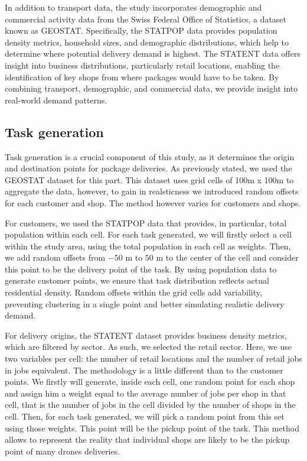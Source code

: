In addition to transport data, the study incorporates demographic and commercial activity data from the Swiss Federal Office of Statistics, a dataset known as GEOSTAT. Specifically, the STATPOP data provides population density metrics, household sizes, and demographic distributions, which help to determine where potential delivery demand is highest. The STATENT data offers insight into business distributions, particularly retail locations, enabling the identification of key shops from where packages would have to be taken. By combining transport, demographic, and commercial data, we provide insight into real-world demand patterns.

\subsection{Task generation}

Task generation is a crucial component of this study, as it determines the origin and destination points for package deliveries. As previously stated, we used the GEOSTAT dataset for this part. This dataset uses grid cells of 100m x 100m to aggregate the data, however, to gain in realsticness we introduced random offsets for each customer and shop. The method however varies for customers and shops.

For customers, we used the STATPOP data that provides, in particular, total population within each cell. For each task generated, we will firstly select a cell within the study area, using the total population in each cell as weights. Then, we add random offsets from $-50 \textrm{ m}$ to $50 \textrm{ m}$ to the center of the cell and consider this point to be the delivery point of the task. By using population data to generate customer points, we ensure that task distribution reflects actual residential density. Random offsets within the grid cells add variability, preventing clustering in a single point and better simulating realistic delivery demand.

For delivery origins, the STATENT dataset provides business density metrics, which are filtered by sector. As such, we selected the retail sector. Here, we use two variables per cell: the number of retail locations and the number of retail jobs in jobs equivalent. The methodology is a little different than to the customer points. We firstly will generate, inside each cell, one random point for each shop and assign him a weight equal to the average number of jobs per shop in that cell, that is the number of jobs in the cell divided by the number of shops in the cell. Then, for each task generated, we will pick a random point from this set using those weights. This point will be the pickup point of the task. This method allows to represent the reality that individual shops are likely to be the pickup point of many drones deliveries.

